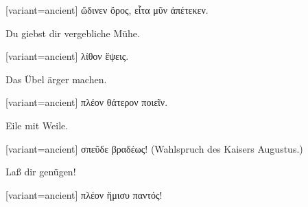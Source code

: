 \begin{greek}[variant=ancient]%
ὤδινεν ὄρος, εἶτα μῦν ἀπέτεκεν.

\end{greek}%
\switchcolumn*

Du giebst dir vergebliche Mühe.

\switchcolumn

\begin{greek}[variant=ancient]%
λίθον ἕψεις.

\end{greek}%
\switchcolumn*

Das Übel ärger machen.

\switchcolumn

\begin{greek}[variant=ancient]%
πλέον θάτερον ποιεῖν.

\end{greek}%
\switchcolumn*

Eile mit Weile.

\switchcolumn

\begin{greek}[variant=ancient]%
σπεῦδε βραδέως!\textgerman[spelling=old,babelshorthands=true]{ (Wahlspruch
des Kaisers Augustus.)}

\end{greek}%
\switchcolumn*

Laß dir genügen!

\switchcolumn

\begin{greek}[variant=ancient]%
πλέον ἥμισυ παντός!

\end{greek}%
